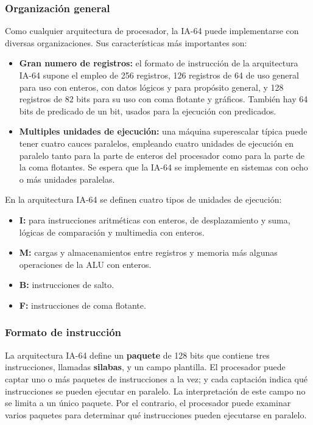 \subsubsection{Organización general}

Como cualquier arquitectura de procesador, la IA-64 puede implementarse con diversas organizaciones. Sus características más importantes son:

\begin{itemize}
  \item \textbf{Gran numero de registros:} el formato de instrucción de la arquitectura IA-64 supone el empleo de 256 registros, 126 registros de 64 de uso general para uso con enteros, con datos lógicos y para propósito general, y 128 registros de 82 bits para su uso con coma flotante y gráficos. También hay 64 bits de predicado de un bit, usados para la ejecución con predicados.
  \item \textbf{Multiples unidades de ejecución:} una máquina superescalar típica puede tener cuatro cauces paralelos, empleando cuatro unidades de ejecución en paralelo tanto para la parte de enteros del procesador como para la parte de la coma flotantes. Se espera que la IA-64 se implemente en sistemas con ocho o más unidades paralelas.
\end{itemize}

En la arquitectura IA-64 se definen cuatro tipos de unidades de ejecución:

\begin{itemize}
  \item \textbf{I:} para instrucciones aritméticas con enteros, de desplazamiento y suma, lógicas de comparación y multimedia con enteros.
  \item \textbf{M:} cargas y almacenamientos entre registros y memoria más algunas operaciones de la ALU con enteros.
  \item \textbf{B:} instrucciones de salto.
  \item \textbf{F:} instrucciones de coma flotante.
\end{itemize}

\subsubsection*{Formato de instrucción}

La arquitectura IA-64 define un \textbf{paquete} de 128 bits que contiene tres instrucciones, llamadas \textbf{silabas}, y un campo plantilla. El procesador puede captar uno o más paquetes de instrucciones a la vez; y cada captación indica qué instrucciones se pueden ejecutar en paralelo. La interpretación de este campo no se limita a un único paquete. Por el contrario, el procesador puede examinar varios paquetes para determinar qué instrucciones pueden ejecutarse en paralelo. 

